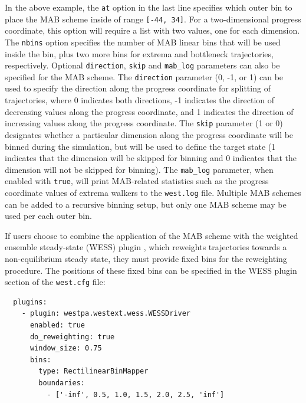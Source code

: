 In the above example, the \verb|at| option in the last line specifies which outer bin to place the MAB scheme inside of range \verb|[-44, 34]|. 
For a two-dimensional progress coordinate, this option will require a list with two values, one for each dimension. 
The \verb|nbins| option specifies the number of MAB linear bins that will be used inside the bin, plus two more bins for extrema and bottleneck trajectories, respectively. 
Optional \verb|direction|, \verb|skip| and \verb|mab_log| parameters can also be specified for the MAB scheme. 
The \verb|direction| parameter (0, -1, or 1) can be used to specify the direction along the progress coordinate for splitting of trajectories, where 0 indicates both directions, -1 indicates the direction of decreasing values along the progress coordinate, and 1 indicates the direction of increasing values along the progress coordinate. 
The \verb|skip| parameter  (1 or 0) designates whether a particular dimension along the progress coordinate will be binned during the simulation, but will be used to define the target state (1 indicates that the dimension will be skipped for binning and 0 indicates that the dimension will not be skipped for binning). 
The \verb|mab_log| parameter, when enabled with \verb|true|, will print MAB-related statistics such as the progress coordinate values of extrema walkers to the \verb|west.log| file. 
Multiple MAB schemes can be added to a recursive binning setup, but only one MAB scheme may be used per each outer bin.

If users choose to combine the application of the MAB scheme with the weighted ensemble steady-state (WESS) plugin \citep{bhatt_steady-state_2010}, which reweights trajectories towards a non-equilibrium steady state, they must provide fixed bins for the reweighting procedure. 
The positions of these fixed bins can be specified in the WESS plugin section of the \verb|west.cfg| file:
\newpage
\begin{verbatim}
  plugins:
    - plugin: westpa.westext.wess.WESSDriver
      enabled: true
      do_reweighting: true
      window_size: 0.75
      bins:
        type: RectilinearBinMapper
        boundaries:
          - ['-inf', 0.5, 1.0, 1.5, 2.0, 2.5, 'inf']
          
\end{verbatim}

